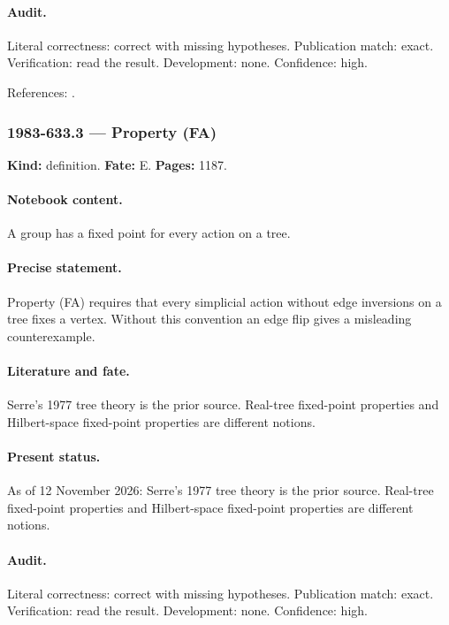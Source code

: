 \paragraph{Audit.} Literal correctness: correct with missing hypotheses. Publication match: exact. Verification: read the result. Development: none. Confidence: high.

\noindent References: \citep{bekkadelaharpevalette2008kazhdan}.\par

\subsubsection{1983-633.3 --- Property (FA)}

\label{item:1983-633.3}

\noindent\textbf{Kind:} definition. \textbf{Fate:} E. \textbf{Pages:} 1187.\par

\paragraph{Notebook content.} A group has a fixed point for every action on a tree.

\paragraph{Precise statement.} Property (FA) requires that every simplicial action without edge inversions on a tree fixes a vertex. Without this convention an edge flip gives a misleading counterexample.

\paragraph{Literature and fate.} Serre's 1977 tree theory is the prior source. Real-tree fixed-point properties and Hilbert-space fixed-point properties are different notions.

\paragraph{Present status.} As of 12 November 2026: Serre's 1977 tree theory is the prior source. Real-tree fixed-point properties and Hilbert-space fixed-point properties are different notions.

\paragraph{Audit.} Literal correctness: correct with missing hypotheses. Publication match: exact. Verification: read the result. Development: none. Confidence: high.

